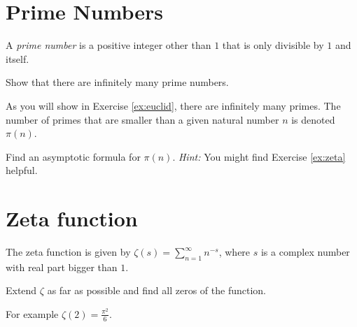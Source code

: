 \documentclass{article}
\begin{document}
\section{Prime Numbers}

A \emph{prime number} is a positive integer other than $1$ that is only
divisible by $1$ and itself.

\begin{exercise}[subtitle=Euclid's Theorem]
  \label{ex:euclid}
  Show that there are infinitely many prime numbers.
\end{exercise}

As you will show in Exercise \ref{ex:euclid}, there are infinitely many
primes.  The number of primes that are smaller than a given natural number $n$
is denoted $\pi(n)$.

\begin{exercise}
  Find an asymptotic formula for $\pi(n)$. \emph{Hint:} You might find
  Exercise \ref{ex:zeta} helpful.
\end{exercise}


\section{Zeta function}

The zeta function is given by $\zeta(s) = \sum_{n=1}^\infty n^{-s}$, where $s$
is a complex number with real part bigger than $1$.
\begin{exercise}\label{ex:zeta}
  Extend $\zeta$ as far as possible and find all zeros
  of the function.
\end{exercise}
For example $\zeta(2) = \frac{\pi^2}{6}$.


\end{document}
